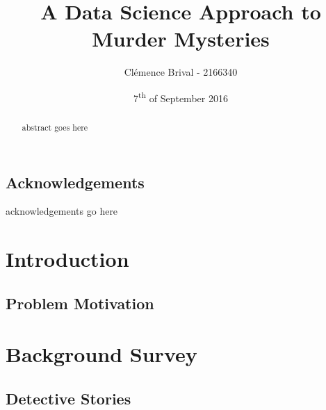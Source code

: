 \documentclass{mproj}
\begin{document}
\title{A Data Science Approach to Murder Mysteries}
\author{Cl\'{e}mence Brival - 2166340}
\date{7\textsuperscript{th} of September 2016}
\maketitle


\begin{abstract}
abstract goes here
\end{abstract}

\educationalconsent


\newpage
\section*{Acknowledgements}

acknowledgements go here


\tableofcontents


\chapter{Introduction}\label{intro}

\section{Problem Motivation}


\chapter{Background Survey}\label{survey}


\section{Detective Stories}
\end{document}
